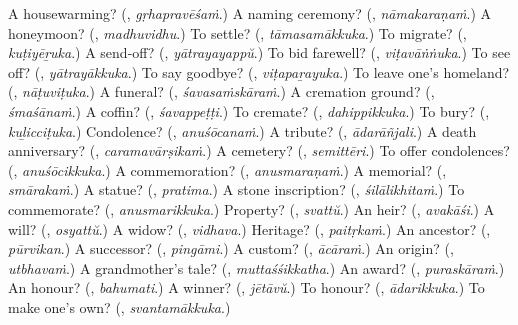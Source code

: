 \begin{tcolorbox}[breakable,colback=teal!4,colframe=teal!35!black,title={Before you move on}]
A housewarming? (\textbf{}, \emph{gṛhapravēśaṁ}.) A naming ceremony? (\textbf{}, \emph{nāmakaraṇaṁ}.) A honeymoon? (\textbf{}, \emph{madhuvidhu}.) To settle? (\textbf{}, \emph{tāmasamākkuka}.) To migrate? (\textbf{}, \emph{kuṭiyēṟuka}.) A send-off? (\textbf{}, \emph{yātrayayappŭ}.) To bid farewell? (\textbf{}, \emph{viṭavāṅṅuka}.) To see off? (\textbf{}, \emph{yātrayākkuka}.) To say goodbye? (\textbf{}, \emph{viṭapaṟayuka}.) To leave one's homeland? (\textbf{}, \emph{nāṭuviṭuka}.) A funeral? (\textbf{}, \emph{śavasaṁskāraṁ}.) A cremation ground? (\textbf{}, \emph{śmaśānaṁ}.) A coffin? (\textbf{}, \emph{śavappeṭṭi}.) To cremate? (\textbf{}, \emph{dahippikkuka}.) To bury? (\textbf{}, \emph{kuḻicciṭuka}.) Condolence? (\textbf{}, \emph{anuśōcanaṁ}.) A tribute? (\textbf{}, \emph{ādarāñjali}.) A death anniversary? (\textbf{}, \emph{caramavārṣikaṁ}.) A cemetery? (\textbf{}, \emph{semittēri}.) To offer condolences? (\textbf{}, \emph{anuśōcikkuka}.) A commemoration? (\textbf{}, \emph{anusmaraṇaṁ}.) A memorial? (\textbf{}, \emph{smārakaṁ}.) A statue? (\textbf{}, \emph{pratima}.) A stone inscription? (\textbf{}, \emph{śilālikhitaṁ}.) To commemorate? (\textbf{}, \emph{anusmarikkuka}.) Property? (\textbf{}, \emph{svattŭ}.) An heir? (\textbf{}, \emph{avakāśi}.) A will? (\textbf{}, \emph{osyattŭ}.) A widow? (\textbf{}, \emph{vidhava}.) Heritage? (\textbf{}, \emph{paitṛkaṁ}.) An ancestor? (\textbf{}, \emph{pūrvikan}.) A successor? (\textbf{}, \emph{pingāmi}.) A custom? (\textbf{}, \emph{ācāraṁ}.) An origin? (\textbf{}, \emph{utbhavaṁ}.) A grandmother's tale? (\textbf{}, \emph{muttaśśikkatha}.) An award? (\textbf{}, \emph{puraskāraṁ}.) An honour? (\textbf{}, \emph{bahumati}.) A winner? (\textbf{}, \emph{jētāvŭ}.) To honour? (\textbf{}, \emph{ādarikkuka}.) To make one's own? (\textbf{}, \emph{svantamākkuka}.)
\end{tcolorbox}
